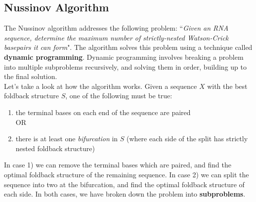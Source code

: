 \documentclass[12pt]{article}
\begin{document}
\subsection{Nussinov Algorithm}
The Nussinov algorithm addresses the following problem: ``{\it Given an RNA sequence, determine the maximum number of strictly-nested Watson-Crick basepairs it can form}". The algorithm solves this problem using a technique called {\bf dynamic programming}. Dynamic programming involves breaking a problem into multiple subproblems recursively, and solving them in order, building up to the final solution.\\[10pt]
Let's take a look at how the algorithm works. Given a sequence $X$ with the best foldback structure $S$, one of the following must be true: 
\begin{enumerate}
    \item the terminal bases on each end of the sequence are paired\\[9pt]
    OR
    \item there is at least one {\it bifurcation} in $S$ (where each side of the split has strictly nested foldback structure)
\end{enumerate} 
In case 1) we can remove the terminal bases which are paired, and find the optimal foldback structure of the remaining sequence. In case 2) we can split the sequence into two at the bifurcation, and find the optimal foldback structure of each side. In both cases, we have broken down the problem into \textbf{subproblems}.
\end{document}
